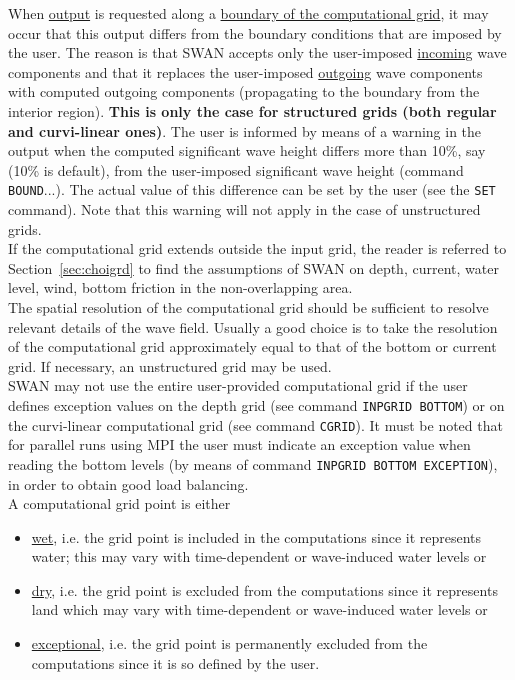 \documentclass[12pt]{book}
\begin{document}
\noindent
When \underline{output} is requested along a \underline{boundary of the computational grid}, it may occur
that this output differs from the boundary conditions that are imposed by the user. The reason is that
SWAN accepts only the user-imposed \underline{incoming} wave components and that it replaces the user-imposed
\underline{outgoing} wave components with computed outgoing components (propagating to the boundary from
the interior region). {\bf This is only the case for structured grids (both regular and curvi-linear ones)}.
The user is informed by means of a warning in the output when the
computed significant wave height differs more than 10\%, say (10\% is default), from the user-imposed
significant wave height (command {\tt BOUND}...). The actual value of this difference can be set by the
user (see the {\tt SET} command). Note that this warning will not apply in the case of unstructured grids.
\\[2ex]
\noindent
If the computational grid extends outside the input grid, the reader is referred to Section~\ref{sec:choigrd}
to find the assumptions of SWAN on depth, current, water level, wind, bottom friction in the non-overlapping area.
\\[2ex]
\noindent
The spatial resolution of the computational grid should be sufficient to resolve relevant details of the wave
field. Usually a good choice is to take the resolution of the computational grid approximately equal to that
of the bottom or current grid. If necessary, an unstructured grid may be used.
\\[2ex]
\noindent
SWAN may not use the entire user-provided computational grid if the user defines exception values on
the depth grid (see command {\tt INPGRID BOTTOM}) or on the curvi-linear computational grid (see command
{\tt CGRID}).
It must be noted that for parallel runs using MPI the user must indicate an exception value when
reading the bottom levels (by means of command {\tt INPGRID BOTTOM EXCEPTION}), in order to obtain
good load balancing.
\\[2ex]
\noindent
A computational grid point is either
\begin{itemize}
  \item \underline{wet}, i.e. the grid point is included in the computations since it represents water; this may vary
         with time-dependent or wave-induced water levels or
  \item \underline{dry}, i.e. the grid point is excluded from the computations since it represents land which may vary
        with time-dependent or wave-induced water levels or
  \item \underline{exceptional}, i.e. the grid point is permanently excluded from the computations since it is so
        defined by the user.
\end{itemize}
\end{document}
